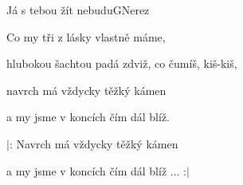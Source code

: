 \begin{song}{Já s tebou žít nebudu}{G}{Nerez}
\begin{SBChorus}
Co my tři z lásky vlastně máme,

hlubokou šachtou padá zdviž, co čumíš, kiš-kiš,

navrch má vždycky těžký kámen

a my jsme v koncích čím dál blíž.

\end{SBChorus}

\begin{SBChorus*}

$|$: Navrch má vždycky těžký kámen

a my jsme v koncích čím dál blíž ... :$|$

\end{SBChorus*}

\end{song}

\clearpage
